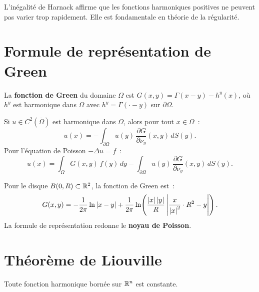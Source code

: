\begin{remarque}
L'in\'egalit\'e de Harnack affirme que les fonctions harmoniques positives
ne peuvent pas varier trop rapidement. Elle est fondamentale en th\'eorie
de la r\'egularit\'e.
\end{remarque}

\section{Formule de repr\'esentation de Green}

\begin{definition}
La \textbf{fonction de Green} du domaine $\Omega$ est $G(x,y) = \Gamma(x-y) - h^y(x)$,
o\`u $h^y$ est harmonique dans $\Omega$ avec $h^y = \Gamma(\cdot - y)$ sur
$\partial\Omega$.
\end{definition}

\begin{theoreme}
Si $u \in C^2(\overline{\Omega})$ est harmonique dans $\Omega$, alors
pour tout $x \in \Omega$~:
\begin{equation}\label{eq:representation_green}
    u(x) = -\int_{\partial\Omega} u(y)\, \frac{\partial G}{\partial \nu_y}(x,y)\, dS(y).
\end{equation}
Pour l'\'equation de Poisson $-\Delta u = f$~:
\begin{equation}\label{eq:representation_poisson}
    u(x) = \int_\Omega G(x,y)\, f(y)\, dy
    - \int_{\partial\Omega} u(y)\, \frac{\partial G}{\partial \nu_y}(x,y)\, dS(y).
\end{equation}
\end{theoreme}

\begin{exemple}
Pour le disque $B(0,R) \subset \mathbb{R}^2$, la fonction de Green est~:
\[
    G(x,y) = -\frac{1}{2\pi}\ln\left| x-y \right|
    + \frac{1}{2\pi}\ln\!\left(\frac{\left| x \right|\left| y \right|}{R}\left| \frac{x}{\left| x \right|^2} \cdot R^2 - y \right|\right).
\]
La formule de repr\'esentation redonne le \textbf{noyau de Poisson}.
\end{exemple}

\section{Th\'eor\`eme de Liouville}

\begin{theoreme}
Toute fonction harmonique born\'ee sur $\mathbb{R}^n$ est constante.
\end{theoreme}

